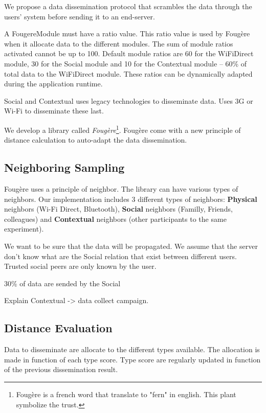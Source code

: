 



We propose a data dissemination protocol that scrambles the data through the users' system before sending it to an end-server.



A FougereModule must have a ratio value.
This ratio value is used by Foug\`ere when it allocate data to the different modules.
The sum of module ratios activated cannot be up to 100.
Default module ratios are 60 for the WiFiDirect module, 30 for the Social module and 10 for the Contextual module -- 60\% of total data to the WiFiDirect module.
These ratios can be dynamically adapted during the application runtime.


Social and Contextual uses legacy technologies to disseminate data.
Uses 3G or Wi-Fi to disseminate these last.



We develop a library called \textit{Foug\`ere}\footnote{Foug\`ere is a french word that translate to "fern" in english. This plant symbolize the trust.}.
Foug\`ere come with a new principle of distance calculation to auto-adapt the data dissemination.

\subsection{Neighboring Sampling}

Foug\`ere uses a principle of neighbor.
The library can have various types of neighbors.
Our implementation includes 3 different types of neighbors: \textbf{Physical} neighbors (Wi-Fi Direct, Bluetooth), \textbf{Social} neighbors (Familly, Friends, colleagues) and \textbf{Contextual} neighbors (other participants to the same experiment).

We want to be sure that the data will be propagated.
We assume that the server don't know what are the Social relation that exist between different users.
Trusted social peers are only known by the user.

30\% of data are sended by the Social


Explain Contextual -> data collect campaign.

\subsection{Distance Evaluation}

Data to disseminate are allocate to the different types available.
The allocation is made in function of each type score.
Type score are regularly updated in function of the previous dissemination result.

